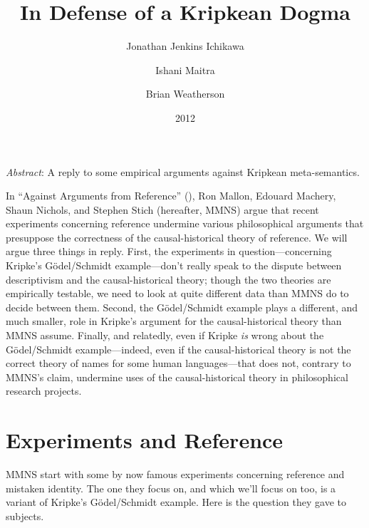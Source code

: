 \documentclass[
  11pt,
  letterpaper,
  DIV=11,
  numbers=noendperiod,
  twoside]{scrartcl}
\title{In Defense of a Kripkean Dogma}
\author{Jonathan Jenkins Ichikawa \and Ishani Maitra \and Brian
Weatherson}
\date{2012}
\renewenvironment{abstract}
 {\vspace{-1.25cm}
 \quotation\small\noindent\emph{Abstract}:}
 {\endquotation}
\begin{document}
\maketitle
\begin{abstract}
A reply to some empirical arguments against Kripkean meta-semantics.
\end{abstract}


In ``Against Arguments from Reference'' (), Ron Mallon, Edouard Machery, Shaun Nichols, and Stephen
Stich (hereafter, MMNS) argue that recent experiments concerning
reference undermine various philosophical arguments that presuppose the
correctness of the causal-historical theory of reference. We will argue
three things in reply. First, the experiments in question---concerning
Kripke's Gödel/Schmidt example---don't really speak to the dispute
between descriptivism and the causal-historical theory; though the two
theories are empirically testable, we need to look at quite different
data than MMNS do to decide between them. Second, the Gödel/Schmidt
example plays a different, and much smaller, role in Kripke's argument
for the causal-historical theory than MMNS assume. Finally, and
relatedly, even if Kripke \emph{is} wrong about the Gödel/Schmidt
example---indeed, even if the causal-historical theory is not the
correct theory of names for some human languages---that does not,
contrary to MMNS's claim, undermine uses of the causal-historical theory
in philosophical research projects.

\section{Experiments and Reference}\label{experiments-and-reference}

MMNS start with some by now famous experiments concerning reference and
mistaken identity. The one they focus on, and which we'll focus on too,
is a variant of Kripke's Gödel/Schmidt example. Here is the question
they gave to subjects.
\end{document}
